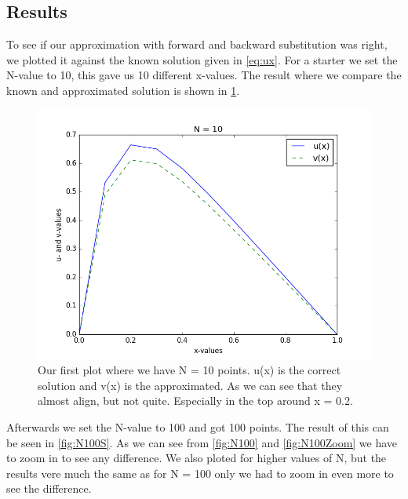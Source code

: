 \documentclass[12pt,a4paper]{article}
\begin{document}
\subsection*{Results}
To see if our approximation with forward and backward substitution was right, we plotted it against the known solution given in \eqref{eq:ux}. For a starter we set the N-value to 10, this gave us 10 different x-values. The result where we compare the known and approximated solution is shown in \ref{fig:N10}.
\begin{figure}[H]
\centering
\includegraphics[scale=0.5]{../plots/task_b_N_10.png}
\caption{Our first plot where we have N = 10 points. u(x) is the correct solution and v(x) is the approximated. As we can see that they almost align, but not quite. Especially in the top around x = 0.2.}
\label{fig:N10}
\end{figure}
Afterwards we set the N-value to 100 and got 100 points. The result of this can be seen in \ref{fig:N100S}. As we can see from \ref{fig:N100} and \ref{fig:N100Zoom} we have to zoom in to see any difference. We also ploted for higher values of N, but the results vere much the same as for N = 100 only we had to zoom in even more to see the difference.
\end{document}
